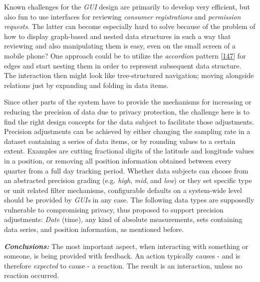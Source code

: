 \documentclass[12pt,english,a4paper,titlepage,cleardoublepage=empty,dottedtoc]{report}
\begin{document}
Known challenges for the \emph{GUI} design are primarily to develop very
efficient, but also fun to use interfaces for reviewing \emph{consumer
registrations} and \emph{permission requests}. The latter can become
especially hard to solve because of the problem of how to display
graph-based and nested data structures in such a way that reviewing and
also manipulating them is easy, even on the small screen of a mobile
phone? One approach could be to utilize the \emph{accordion} pattern
{[}\protect\hyperlink{ref-web_2016_wikipedia_accordion-gui}{147}{]} for
edges and start nesting them in order to represent subsequent data
structure. The interaction then might look like tree-structured
navigation; moving alongside relations just by expanding and folding in
data items.

Since other parts of the system have to provide the mechanisms for
increasing or reducing the precision of data due to privacy protection,
the challenge here is to find the right design concepts for the data
subject to facilitate those adjustments. Precision adjustments can be
achieved by either changing the sampling rate in a dataset containing a
series of data items, or by rounding values to a certain extent.
Examples are cutting fractional digits of the latitude and longitude
values in a position, or removing all position information obtained
between every quarter from a full day tracking period. Whether data
subjects can choose from an abstracted precision grading (e.g.
\emph{high}, \emph{mid}, and \emph{low}) or they set specific type or
unit related filter mechanisms, configurable defaults on a system-wide
level should be provided by \emph{GUIs} in any case. The following data
types are supposedly vulnerable to compromising privacy, thus proposed
to support precision adjustments: \emph{Date} (time), any kind of
absolute measurements, sets containing data series, and position
information, as mentioned before.

\emph{\textbf{Conclusions:}} The most important aspect, when interacting
with something or someone, is being provided with feedback. An action
typically causes - and is therefore \emph{expected} to cause - a
reaction. The result is an interaction, unless no reaction occurred.
\end{document}
